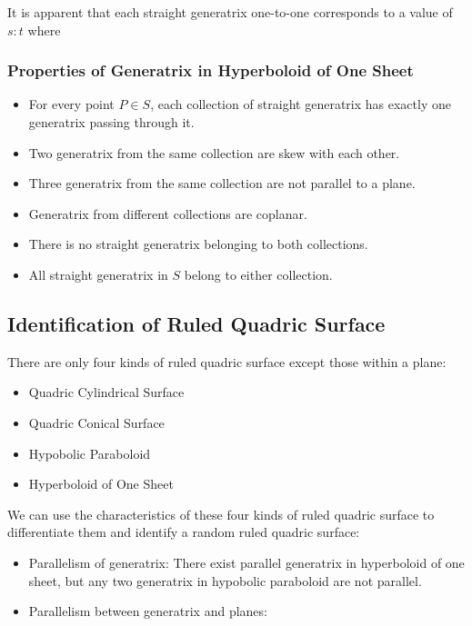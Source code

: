 \documentclass[onecolumn]{ctexart}
\begin{document}
It is apparent that each straight generatrix one-to-one corresponds to a value of $s:t$ where

\subsubsection{Properties of Generatrix in Hyperboloid of One Sheet}
\begin{itemize}
  \item For every point $P \in S$, each collection of straight generatrix has 
  exactly one generatrix passing through it.
  \item Two generatrix from the same collection are skew with each other.
  \item Three generatrix from the same collection are not parallel to a plane.
  \item Generatrix from different collections are coplanar.
  \item There is no straight generatrix belonging to both collections.
  \item All straight generatrix in $S$ belong to either collection.
\end{itemize}

\subsection{Identification of Ruled Quadric Surface}

There are only four kinds of ruled quadric surface except those within a plane:
\begin{itemize}
  \item Quadric Cylindrical Surface
  \item Quadric Conical Surface
  \item Hypobolic Paraboloid
  \item Hyperboloid of One Sheet
\end{itemize}

We can use the characteristics of these four kinds of ruled quadric surface to 
differentiate them and identify a random ruled quadric surface:
\begin{itemize}
  \item Parallelism of generatrix: There exist parallel generatrix in 
  hyperboloid of one sheet, but any two generatrix in hypobolic paraboloid are 
  not parallel.
  \item Parallelism between generatrix and planes: 
\end{itemize}
\end{document}
